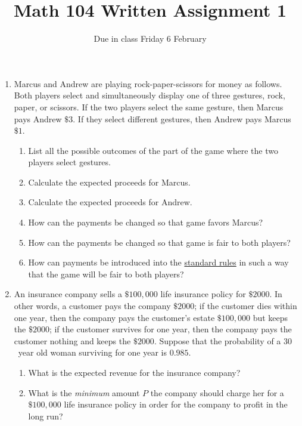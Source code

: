 \documentclass[12pt]{article}
\author{}\date{Due in class Friday 6 February}
\title{Math 104 Written Assignment 1}\author{}
\begin{document}
\maketitle
\pagestyle{empty}
\begin{enumerate}
\item Marcus and Andrew are playing rock-paper-scissors
for money as follows. Both players select and simultaneously display
one of three gestures, rock, paper, or scissors.
If the two players select the same gesture, then Marcus pays Andrew 
$\$3$. If they select different gestures, then Andrew pays Marcus $\$1$.
\begin{enumerate}
\item List all the possible outcomes of the part of the game
where the two players select gestures.
\vspace{.6in}
\item Calculate the expected proceeds for Marcus.
\vspace{.6in}
\item Calculate the expected proceeds for Andrew.
\vspace{.6in}
\item How can the payments be changed so that game favors Marcus?
\vspace{.6in}
\item How can the payments be changed so that game is fair to both
players?
\vspace{.6in}
\item How can payments be introduced into the
\href{http://en.wikipedia.org/wiki/Rock-paper-scissors}{standard rules}
in such a way that the game will be fair to both players?
\end{enumerate}
\newpage

\item An insurance company sells a $\$100,000$
life insurance policy for $\$2000$. 
In other words, a customer pays the company $\$2000$;
if the customer dies within one year, then the company
pays the customer's estate $\$100,000$ but keeps the $\$2000$;
if the customer survives for one year, then
the company pays the customer nothing and keeps the $\$2000$. 
Suppose that the probability of a $30$~year old woman surviving
for one year is $0.985$.
\begin{enumerate}
\item What is the expected revenue for the insurance company?
\vspace{2in}
\item What is the {\em minimum} amount $P$ the
company should charge her for a $\$100,000$ life
insurance policy in order
for the company to profit in the long run?
\end{enumerate}
\end{enumerate}
\end{document}
